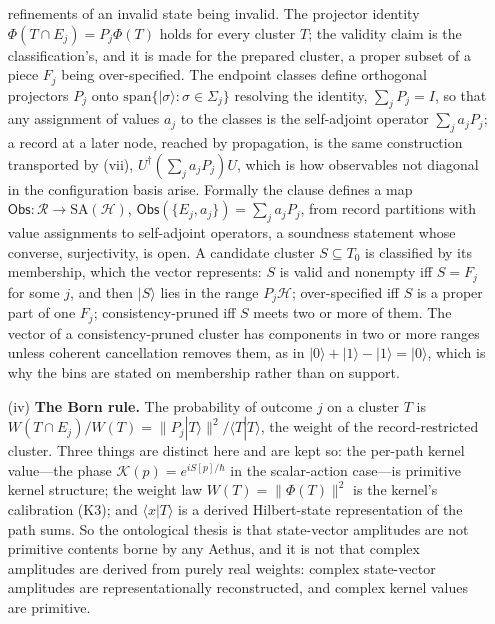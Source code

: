 \begin{theorem}
\begin{enumerate}
refinements of an invalid state being invalid. The projector identity $\Phi(T \cap E_j) = P_j \Phi(T)$ holds for every cluster $T$; the validity claim is the classification's, and it is made for the prepared cluster, a proper subset of a piece $F_j$ being over-specified. The endpoint classes define orthogonal projectors $P_j$ onto $\mathrm{span}\{|\sigma\rangle : \sigma \in \Sigma_j\}$ resolving the identity, $\sum_j P_j = I$, so that any assignment of values $a_j$ to the classes is the self-adjoint operator $\sum_j a_j P_j$; a record at a later node, reached by propagation, is the same construction transported by (vii), $U^\dagger(\sum_j a_j P_j)U$, which is how observables not diagonal in the configuration basis arise. Formally the clause defines a map $\mathsf{Obs} : \mathcal{R} \to \mathrm{SA}(\mathcal{H})$, $\mathsf{Obs}(\{E_j, a_j\}) = \sum_j a_j P_j$, from record partitions with value assignments to self-adjoint operators, a soundness statement whose converse, surjectivity, is open. A candidate cluster $S \subseteq T_0$ is classified by its membership, which the vector represents: $S$ is valid and nonempty iff $S = F_j$ for some $j$, and then $|S\rangle$ lies in the range $P_j\mathcal{H}$; over-specified iff $S$ is a proper part of one $F_j$; consistency-pruned iff $S$ meets two or more of them. The vector of a consistency-pruned cluster has components in two or more ranges unless coherent cancellation removes them, as in $|0\rangle + |1\rangle - |1\rangle = |0\rangle$, which is why the bins are stated on membership rather than on support.
\item[(iv)] \textbf{The Born rule.} The probability of outcome $j$ on a cluster $T$ is $W(T \cap E_j)/W(T) = \lVert P_j|T\rangle\rVert^2/\langle T|T\rangle$, the weight of the record-restricted cluster. Three things are distinct here and are kept so: the per-path kernel value---the phase $\mathcal{K}(p) = e^{iS[p]/\hbar}$ in the scalar-action case---is primitive kernel structure; the weight law $W(T) = \lVert\Phi(T)\rVert^2$ is the kernel's calibration (K3); and $\langle x|T\rangle$ is a derived Hilbert-state representation of the path sums. So the ontological thesis is that state-vector amplitudes are not primitive contents borne by any Aethus, and it is not that complex amplitudes are derived from purely real weights: complex state-vector amplitudes are representationally reconstructed, and complex kernel values are primitive.

\end{enumerate}
\end{theorem}
